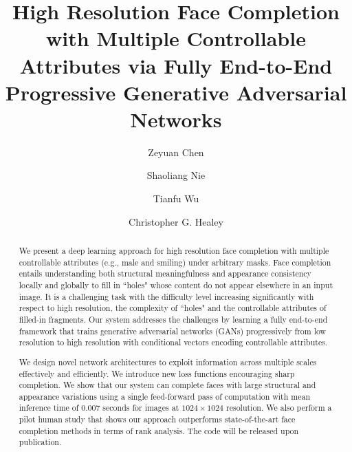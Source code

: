 \documentclass[acmtog,timestamp]{acmart}
\begin{document}
\title{High Resolution Face Completion with Multiple Controllable Attributes via Fully End-to-End Progressive Generative Adversarial Networks}


\author{Zeyuan Chen}

\author{Shaoliang Nie}
\author{Tianfu Wu}
\author{Christopher G. Healey}

\renewcommand\shortauthors{}

\begin{abstract}
We present a deep learning approach for high resolution face completion with multiple controllable attributes (e.g., male and smiling) under arbitrary masks.  Face completion entails understanding both structural meaningfulness and appearance consistency locally and globally to fill in ``holes" whose content do not appear elsewhere in an input image. It is a challenging task with the difficulty level increasing significantly with respect to high resolution, the complexity of ``holes" and the controllable attributes of filled-in fragments. Our system addresses the challenges by learning a fully end-to-end framework that trains generative adversarial networks (GANs) progressively from low resolution to  high resolution with conditional vectors encoding controllable attributes.

We design novel network architectures to exploit information across multiple scales effectively and efficiently. We introduce new loss functions encouraging sharp completion. We show that our system can complete faces with large structural and appearance variations using a single feed-forward pass of computation with mean inference time of 0.007 seconds for images at $1024\times 1024$ resolution. We also perform a pilot human study that shows our approach outperforms state-of-the-art face completion methods in terms of rank analysis. The code will be released upon publication. 
\end{abstract}
\end{document}
